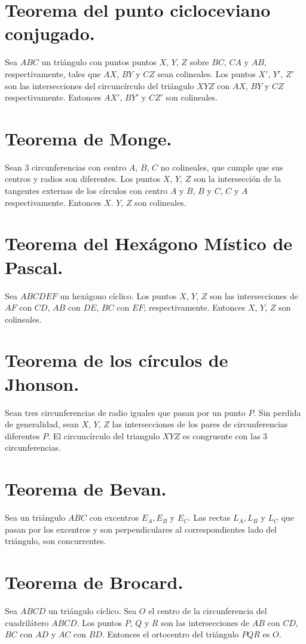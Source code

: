 \documentclass[12pt,a4paper]{book}
\begin{document}
\section{Teorema del punto cicloceviano conjugado.}
Sea $ABC$ un triángulo con puntos puntos $X$, $Y$, $Z$ sobre ${BC}$, ${CA}$ y ${AB}$, respectivamente, tales que $AX$, $BY$ y $CZ$ sean colineales. Los puntos $X'$, $Y'$, $Z'$ son las intersecciones del circuncírculo del triángulo $XYZ$ con $AX$, $BY$ y $CZ$ respectivamente. Entonces $AX'$, $BY'$ y $CZ'$ son colineales.
\section{Teorema de Monge.}
Sean 3 circunferencias con centro $A$, $B$, $C$ no colineales, que cumple que sus centros y radios son diferentes. Los puntos $X$, $Y$, $Z$ son la intersección de la tangentes externas de los círculos con centro $A$ y $B$, $B$ y $C$, $C$ y $A$ respectivamente. Entonces $X$. $Y$, $Z$ son colineales. 
\section{Teorema del Hexágono Místico de Pascal.}
Sea $ABCDEF$ un hexágono cíclico. Los puntos $X$, $Y$, $Z$ son las intersecciones de $AF$ con $CD$, $AB$ con $DE$, $BC$ con $EF$; respectivamente. Entonces $X$, $Y$, $Z$ son colineales.
\section{Teorema de los círculos de Jhonson.}
Sean tres circunferencias de radio iguales que pasan por un punto $P$. Sin perdida de generalidad, sean $X$, $Y$, $Z$ las intersecciones de los pares de circunferencias diferentes $P$. El circuncírculo del triangulo $XYZ$ es congruente con las 3 circunferencias.
\section{Teorema de Bevan.}
Sea un triángulo $ABC$ con excentros $E_A, E_B$ y $E_C$. Las rectas $L_A, L_B$ y $L_C$ que pasan por los excentros y son perpendiculares al correspondientes lado del triángulo, son concurrentes.
\section{Teorema de Brocard.}
Sea $ABCD$ un triángulo cíclico. Sea $O$ el centro de la circunferencia del cuadrilátero $ABCD$. Los puntos $P$, $Q$ y $R$ son las intersecciones de $AB$ con $CD$, $BC$ con $AD$ y $AC$ con $BD$. Entonces el ortocentro del triángulo $PQR$ es $O$. 
\end{document}
